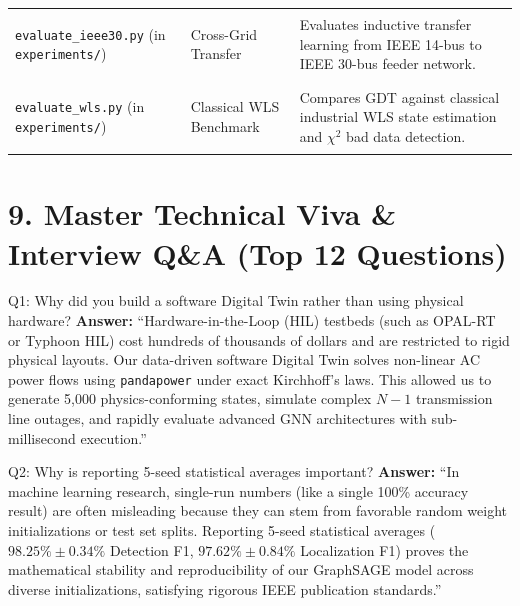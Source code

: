 \documentclass[10pt,a4paper]{article}
\begin{document}
\begin{table}[h!]
\begin{tabularx}{\textwidth}{>{\bfseries\raggedright\arraybackslash}p{3.2cm} >{\raggedright\arraybackslash}p{3.4cm} >{\raggedright\arraybackslash}X}
\addlinespace
\texttt{evaluate\_ieee30.py} \newline \textmd{\scriptsize(in \texttt{experiments/})} & Cross-Grid Transfer & Evaluates inductive transfer learning from IEEE 14-bus to IEEE 30-bus feeder network. \\
\addlinespace
\texttt{evaluate\_wls.py} \newline \textmd{\scriptsize(in \texttt{experiments/})} & Classical WLS Benchmark & Compares GDT against classical industrial WLS state estimation and $\chi^2$ bad data detection. \\
\bottomrule
\end{tabularx}
\end{table}

\section{9. Master Technical Viva \& Interview Q\&A (Top 12 Questions)}

\begin{qabox}{Q1: Why did you build a software Digital Twin rather than using physical hardware?}
\textbf{Answer:}
``Hardware-in-the-Loop (HIL) testbeds (such as OPAL-RT or Typhoon HIL) cost hundreds of thousands of dollars and are restricted to rigid physical layouts. Our data-driven software Digital Twin solves non-linear AC power flows using \texttt{pandapower} under exact Kirchhoff's laws. This allowed us to generate 5,000 physics-conforming states, simulate complex $N-1$ transmission line outages, and rapidly evaluate advanced GNN architectures with sub-millisecond execution.''
\end{qabox}

\begin{qabox}{Q2: Why is reporting 5-seed statistical averages important?}
\textbf{Answer:}
``In machine learning research, single-run numbers (like a single 100\% accuracy result) are often misleading because they can stem from favorable random weight initializations or test set splits. Reporting 5-seed statistical averages ($98.25\% \pm 0.34\%$ Detection F1, $97.62\% \pm 0.84\%$ Localization F1) proves the mathematical stability and reproducibility of our GraphSAGE model across diverse initializations, satisfying rigorous IEEE publication standards.''
\end{qabox}
\end{document}
